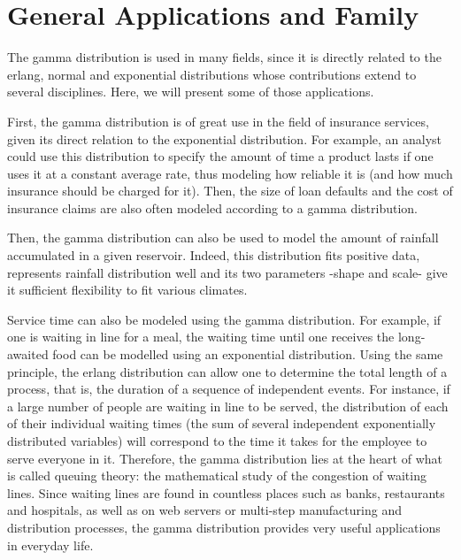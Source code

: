 \documentclass[12pt]{article}
\begin{document}
\singlespacing

\tableofcontents\pagebreak
\doublespacing
\section{General Applications and Family}

The gamma distribution is used in many fields, since it is directly related to the erlang, normal and exponential
distributions whose contributions extend to several disciplines. Here, we will present some of those applications.

First, the gamma distribution is of great use in the field of insurance services, given its direct relation to the
exponential distribution. For example, an analyst could use this distribution to specify the amount of time a product
lasts if one uses it at a constant average rate, thus modeling how reliable it is (and how much insurance should be
charged for it). Then, the size of loan defaults and the cost of insurance claims are also often modeled according to a
gamma distribution.

Then, the gamma distribution can also be used to model the amount of rainfall accumulated in a given reservoir. Indeed,
this distribution fits positive data, represents rainfall distribution well and its two parameters -shape and scale-
give it sufficient flexibility to fit various climates.

Service time can also be modeled using the gamma distribution. For example, if one is waiting in line for a meal, the
waiting time until one receives the long-awaited food can be modelled using an exponential distribution. Using the same
principle, the erlang distribution can allow one to determine the total length of a process, that is, the duration of a
sequence of independent events. For instance, if a large number of people are waiting in line to be served, the
distribution of each of their individual waiting times (the sum of several independent exponentially distributed
variables) will correspond to the time it takes for the employee to serve everyone in it. Therefore, the gamma
distribution lies at the heart of what is called queuing theory: the mathematical study of the congestion of waiting
lines. Since waiting lines are found in countless places such as banks, restaurants and hospitals, as well as on web
servers or multi-step manufacturing and distribution processes, the gamma distribution provides very useful applications
in everyday life.
\end{document}
